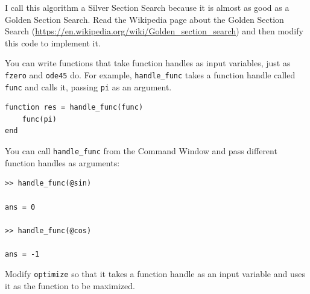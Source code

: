 \documentclass{book}
\begin{document}
\begin{ex}
I call this algorithm a Silver Section Search because it is almost as
good as a Golden Section Search.  Read the Wikipedia page about the
Golden Section Search
(\url{https://en.wikipedia.org/wiki/Golden_section_search}) and then
modify this code to implement it.
\end{ex}

\begin{ex}
You can write functions that take function handles as input
variables, just as {\tt fzero} and {\tt ode45} do.
For example, {\tt handle\_func} takes a function handle called
{\tt func} and calls it, passing {\tt pi} as an argument.

\begin{verbatim}
function res = handle_func(func)
    func(pi)
end
\end{verbatim}

You can call {\tt handle\_func} from the Command Window and pass
different function handles as arguments:

\begin{verbatim}
>> handle_func(@sin)

ans = 0

>> handle_func(@cos)

ans = -1
\end{verbatim}

Modify {\tt optimize} so that it takes a function handle
as an input variable and uses it as the function to be
maximized.
\end{ex}
\end{document}
